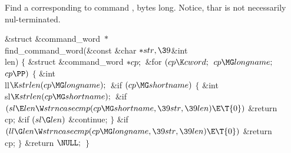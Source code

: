 Find a  corresponding to command ,  bytes long.
Notice, thar  is not necessarily nul-terminated.

\Y\B\&{struct} \&{command\_word} ${}{*}{}$\\{find\_command\_word}(\&{const} %
\&{char} ${}{*}\\{str},\39{}$\&{int} \\{len})\1\1\2\2\6
${}\{{}$\1\6
\&{struct} \&{command\_word} ${}{*}\\{cp};{}$\7
\&{for} ${}(\\{cp}\K\\{cword};{}$ ${}\\{cp}\MG\\{longname};{}$ ${}\\{cp}\PP){}$%
\5
${}\{{}$\1\6
\&{int} \\{ll}${}\K\\{strlen}(\\{cp}\MG\\{longname});{}$\7
\&{if} ${}(\\{cp}\MG\\{shortname}){}$\5
${}\{{}$\1\6
\&{int} \\{sl}${}\K\\{strlen}(\\{cp}\MG\\{shortname});{}$\7
\&{if} ${}(\\{sl}\E\\{len}\W\\{strncasecmp}(\\{cp}\MG\\{shortname},\39\\{str},%
\39\\{len})\E\T{0}){}$\1\5
\&{return} \\{cp};\2\6
\&{if} ${}(\\{sl}\G\\{len}){}$\1\5
\&{continue};\2\6
\4${}\}{}$\2\6
\&{if} ${}(\\{ll}\G\\{len}\W\\{strncasecmp}(\\{cp}\MG\\{longname},\39\\{str},%
\39\\{len})\E\T{0}){}$\1\5
\&{return} \\{cp};\2\6
\4${}\}{}$\2\6
\&{return} ${}\NULL;{}$\6
\4${}\}{}$\2\par
\fi

